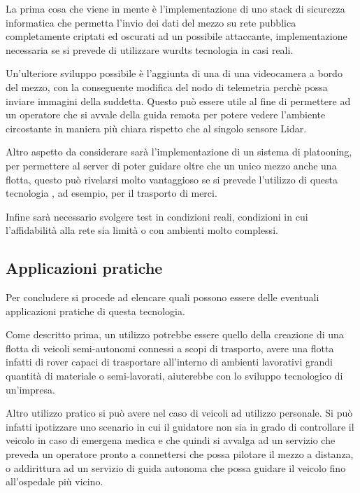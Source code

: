 \noindent La prima cosa che viene in mente è l'implementazione di uno stack di sicurezza informatica che permetta l'invio dei dati del mezzo su rete pubblica completamente criptati ed oscurati ad un possibile attaccante, implementazione necessaria se si prevede di utilizzare wurdts tecnologia in casi reali.

\noindent Un'ulteriore sviluppo possibile è l'aggiunta di una di una videocamera a bordo del mezzo, con la conseguente modifica del nodo di telemetria perchè possa inviare immagini della suddetta. Questo può essere utile al fine di permettere ad un operatore che si avvale della guida remota per potere vedere l'ambiente circostante in maniera più chiara rispetto che al singolo sensore Lidar.

\noindent Altro aspetto da considerare sarà l'implementazione di un sistema di platooning, per permettere al  server di poter guidare oltre che un unico mezzo anche una flotta, questo può rivelarsi molto vantaggioso se si prevede l'utilizzo di questa tecnologia , ad esempio, per il trasporto di merci.

\noindent Infine sarà necessario svolgere test in condizioni reali, condizioni in cui l'affidabilità alla rete sia limità o con ambienti molto complessi.

\subsection{Applicazioni pratiche}
Per concludere si procede ad elencare quali possono essere delle eventuali applicazioni pratiche di questa tecnologia.

\noindent Come descritto prima, un utilizzo potrebbe essere quello della creazione di una flotta di veicoli semi-autonomi connessi a scopi di trasporto, avere una flotta infatti di rover capaci di trasportare all'interno di ambienti lavorativi grandi quantità di materiale o semi-lavorati, aiuterebbe con lo sviluppo tecnologico di un'impresa.

\noindent Altro utilizzo pratico si può avere nel caso di veicoli ad utilizzo personale. Si può infatti ipotizzare uno scenario in cui il guidatore non sia in grado di controllare il veicolo in caso di emergena medica e che quindi si avvalga ad un servizio che preveda un operatore pronto a connettersi che possa pilotare il mezzo a distanza, o addirittura ad un servizio di guida autonoma che possa guidare il veicolo fino all'ospedale più vicino. 
